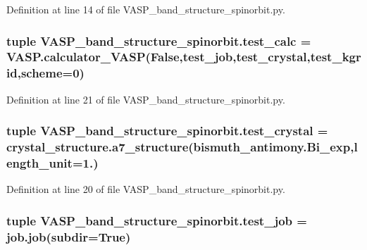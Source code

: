 Definition at line 14 of file V\+A\+S\+P\+\_\+band\+\_\+structure\+\_\+spinorbit.\+py.

\hypertarget{namespace_v_a_s_p__band__structure__spinorbit_a8647c4dce900e7dfd49db3a8408ed71d}{
\subsubsection[{test\+\_\+calc}]{\setlength{\rightskip}{0pt plus 5cm}tuple V\+A\+S\+P\+\_\+band\+\_\+structure\+\_\+spinorbit.\+test\+\_\+calc = V\+A\+S\+P.\+calculator\+\_\+\+V\+A\+S\+P(False,{\bf test\+\_\+job},{\bf test\+\_\+crystal},{\bf test\+\_\+kgrid},scheme=0)}}\label{namespace_v_a_s_p__band__structure__spinorbit_a8647c4dce900e7dfd49db3a8408ed71d}


Definition at line 21 of file V\+A\+S\+P\+\_\+band\+\_\+structure\+\_\+spinorbit.\+py.

\hypertarget{namespace_v_a_s_p__band__structure__spinorbit_a206ed2c3ca40a49bab25c89bbfee0f23}{
\subsubsection[{test\+\_\+crystal}]{\setlength{\rightskip}{0pt plus 5cm}tuple V\+A\+S\+P\+\_\+band\+\_\+structure\+\_\+spinorbit.\+test\+\_\+crystal = crystal\+\_\+structure.\+a7\+\_\+structure(bismuth\+\_\+antimony.\+Bi\+\_\+exp,length\+\_\+unit=1.)}}\label{namespace_v_a_s_p__band__structure__spinorbit_a206ed2c3ca40a49bab25c89bbfee0f23}


Definition at line 20 of file V\+A\+S\+P\+\_\+band\+\_\+structure\+\_\+spinorbit.\+py.

\hypertarget{namespace_v_a_s_p__band__structure__spinorbit_a7f5e201ba4557ceea897bc3337be338f}{
\subsubsection[{test\+\_\+job}]{\setlength{\rightskip}{0pt plus 5cm}tuple V\+A\+S\+P\+\_\+band\+\_\+structure\+\_\+spinorbit.\+test\+\_\+job = job.\+job(subdir=True)}}\label{namespace_v_a_s_p__band__structure__spinorbit_a7f5e201ba4557ceea897bc3337be338f}


